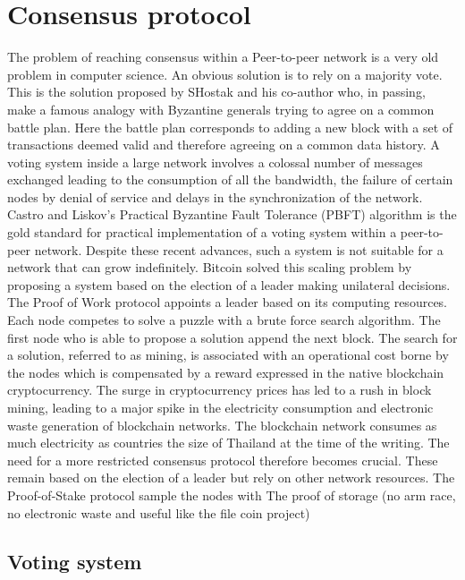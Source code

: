 \chapter{Consensus protocol}\label{sec:consensus}

The problem of reaching consensus within a Peer-to-peer network is a very old problem in computer science. An obvious solution is to rely on a majority vote. This is the solution proposed by SHostak and his co-author who, in passing, make a famous analogy with Byzantine generals trying to agree on a common battle plan. Here the battle plan corresponds to adding a new block with a set of transactions deemed valid and therefore agreeing on a common data history. A voting system inside a large network involves a colossal number of messages exchanged leading to the consumption of all the bandwidth, the failure of certain nodes by denial of service and delays in the synchronization of the network. Castro and Liskov's Practical Byzantine Fault Tolerance (PBFT) algorithm is the gold standard for practical implementation of a voting system within a peer-to-peer network. Despite these recent advances, such a system is not suitable for a network that can grow indefinitely. Bitcoin solved this scaling problem by proposing a system based on the election of a leader making unilateral decisions. The Proof of Work protocol appoints a leader based on its computing resources. Each node competes to solve a puzzle with a brute force search algorithm. The first node who is able to propose a solution append the next block. The search for a solution, referred to as mining, is associated with an operational cost borne by the nodes which is compensated by a reward expressed in the native blockchain cryptocurrency. The surge in cryptocurrency prices has led to a rush in block mining, leading to a major spike in the electricity consumption and electronic waste generation of blockchain networks. The blockchain network consumes as much electricity as countries the size of Thailand at the time of the writing. The need for a more restricted consensus protocol therefore becomes crucial. These remain based on the election of a leader but rely on other network resources. The Proof-of-Stake protocol sample the nodes with
The proof of storage (no arm race, no electronic waste and useful like the file coin project)
\section{Voting system}\label{sec:voting}
